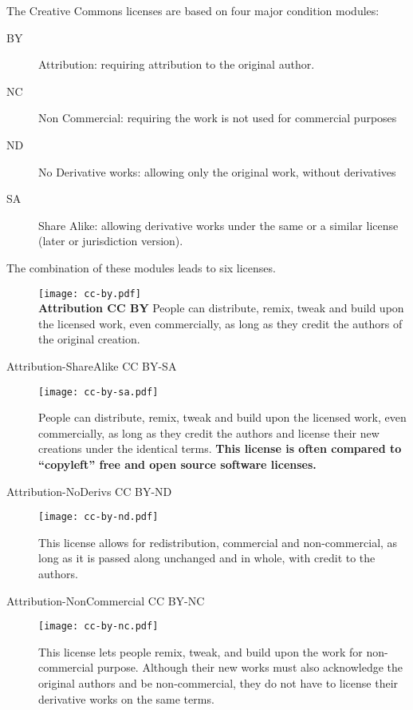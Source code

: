 The Creative Commons licenses are based on four major condition modules:
\begin{description}
    \item[BY] Attribution: requiring attribution to the original author.
    \item[NC] Non Commercial: requiring the work is not used for commercial purposes
    \item[ND] No Derivative works: allowing only the original work, without derivatives
    \item[SA] Share Alike: allowing derivative works under the same or a similar license (later or jurisdiction version).
\end{description}


The combination of these modules leads to six licenses.

\begin{description}
    \item[] \texttt{[image: cc-by.pdf]} \\ \textbf{Attribution CC BY} People can distribute, remix, tweak and build upon the licensed work, even commercially, as long as they credit the authors of the original creation.
    \item[Attribution-ShareAlike CC BY-SA] \begin{center} \texttt{[image: cc-by-sa.pdf]} \end{center} People can distribute, remix, tweak and build upon the licensed work, even commercially, as long as they credit the authors and license their new creations under the identical terms. \textbf{This license is often compared to “copyleft” free and open source software licenses.}
    \item[Attribution-NoDerivs CC BY-ND] \begin{center} \texttt{[image: cc-by-nd.pdf]} \end{center} This license allows for redistribution, commercial and non-commercial, as long as it is passed along unchanged and in whole, with credit to the authors.
    \item[Attribution-NonCommercial CC BY-NC] \begin{center} \texttt{[image: cc-by-nc.pdf]} \end{center} This license lets people remix, tweak, and build upon the work for non-commercial purpose. Although their new works must also acknowledge the original authors and be non-commercial, they do not have to license their derivative works on the same terms.

\end{description}
